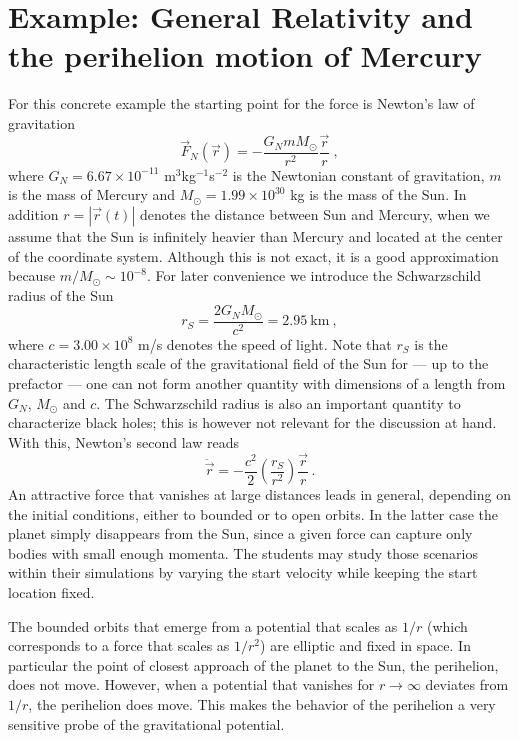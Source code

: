 \documentclass[12pt,ngerman,american]{iopart}
\begin{document}
\section{Example: General Relativity and the perihelion motion of Mercury}\label{sec:gr}
For this concrete example the starting point for the force is Newton's law of gravitation
\begin{equation}
\vec F_N(\vec r) = - \frac{G_N m M_\odot}{r^2} \frac{\vec r}{r}\ ,
\end{equation}
where $G_N=6.67\times 10^{-11}$ m$^3$kg$^{-1}$s$^{-2}$ is the Newtonian constant of gravitation, $m$ is the mass of Mercury and $M_\odot=1.99\times 10^{30}$ kg is the mass of the Sun.
In addition $r=|\vec r(t)|$ denotes the distance between Sun and Mercury, when we assume that the Sun is infinitely heavier than Mercury and located at the center of the coordinate system.
Although this is not exact, it is a good approximation because $m/M_\odot\sim 10^{-8}$.
For later convenience we introduce the Schwarzschild radius of the Sun
\begin{equation}
r_S=\frac{2G_N  M_\odot}{c^2} = 2.95 \ \mbox{km} \ , \label{rsdef}
\end{equation}
where $c=3.00\times 10^8$ m/s denotes the speed of light.
Note that $r_S$ is the characteristic length scale of the gravitational field of the Sun for --- up to the prefactor --- one can not form another quantity with dimensions of a length from $G_N$, $M_\odot$ and $c$.
The Schwarzschild radius is also an important quantity to characterize black holes; this is however not relevant for the discussion at hand.
With this, Newton's second law reads
\begin{equation}
\ddot{\vec r}      = - \frac{c^2}{2}\left(\frac{r_S}{r^2}\right)\frac{\vec r}{r} \, . \label{eq:newton}
\end{equation}
An attractive force that vanishes at large distances leads in general, depending on the initial conditions, either to bounded or to open orbits.
In the latter case the planet simply disappears from the Sun, since a given force can capture only bodies with small enough momenta.
The students may study those scenarios within their simulations by varying the start velocity while keeping the start location fixed.

The bounded orbits that emerge from a potential that scales as $1/r$ (which corresponds to a force that scales as $1/r^2$) are elliptic and fixed in space.
In particular the point of closest approach of the planet to the Sun, the perihelion, does not move.
However, when a potential that vanishes for $r\to \infty$ deviates from $1/r$, the perihelion does move.
This makes the behavior of the perihelion a very sensitive probe of the gravitational potential.
\end{document}
